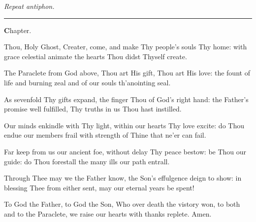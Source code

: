 \documentclass[letterpaper,12pt]{article} %
\begin{document}
\smallskip
{\noindent\emph{Repeat antiphon.}\\}

\smallskip
\hrule
\smallskip

\normalsize
\begin{center}{\large\textbf Chapter.}\end{center}
\begin{parcolumns}[rulebetween]{2}
\end{parcolumns}
\medskip

\large
\normalsize
{}
\begin{multicols}{2}
\begin{psalmverses}
{\item Thou, Holy Ghost, Creater, come,
and make Thy people's souls Thy home:
with grace celestial animate
the hearts Thou didst Thyself create.

\item The Paraclete from God above,
Thou art His gift, Thou art His love:
the fount of life and burning zeal
and of our souls th'anointing seal.

\item As sevenfold Thy gifts expand,
the finger Thou of God's right hand:
the Father's promise well fulfilled,
Thy truths in us Thou hast instilled.

\item Our minds enkindle with Thy light,
within our hearts Thy love excite:
do Thou endue our members frail
with strength of Thine that ne'er can fail.

\item Far keep from us our ancient foe,
without delay Thy peace bestow:
be Thou our guide: do Thou forestall
the many ills our path entrall.

\item Through Thee may we the Father know,
the Son's effulgence deign to show:
in blessing Thee from either sent,
may our eternal years be spent!

\item To God the Father, to God the Son,
Who over death the vistory won,
to both and to the Paraclete,
we raise our hearts with thanks replete.
Amen.
}
\end{psalmverses}
\end{multicols}
\end{document}

